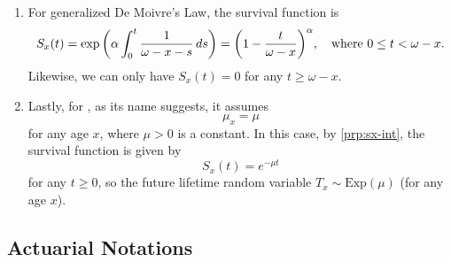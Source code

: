 \begin{enumerate}
\item \label{it:gen-de-moivre-surv}
For generalized De Moivre's Law, the survival function is
\[
S_x(t)=\exp\qty(\alpha\int_{0}^{t}\frac{1}{\omega-x-s}\,ds)
=\qty(1-\frac{t}{\omega-x})^{\alpha},\quad\text{where }0 \le t<\omega-x.
\]
Likewise, we can only have \(S_x(t)=0\) for any \(t\ge\omega-x\).
\item Lastly, for , as its name suggests, it assumes
\[
\mu_x=\mu
\]
for any age \(x\), where \(\mu>0\) is a constant.
In this case, by \cref{prp:sx-int}, the survival function is given by
\[
S_x(t)=e^{-\mu t}
\]
for any \(t\ge 0\), so the future lifetime random variable
\(T_x\sim\mathrm{Exp}(\mu)\) (for any age \(x\)).
\end{enumerate}
\subsection{Actuarial Notations}
